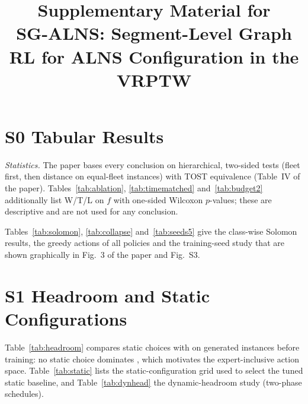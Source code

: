 \documentclass[conference,onecolumn]{IEEEtran}
\begin{document}
\title{Supplementary Material for\\ SG-ALNS: Segment-Level Graph RL for ALNS Configuration in the VRPTW}
\ifanonymous
\author{}
\else
\author{
\and
{}
\and
{}
}
\fi
\maketitle




\section*{S0 Tabular Results}
\emph{Statistics.} The paper bases every conclusion on hierarchical, two-sided tests (fleet first, then distance on
equal-fleet instances) with TOST equivalence (Table~IV of the paper). Tables~\ref{tab:ablation},
\ref{tab:timematched} and~\ref{tab:budget2} additionally list W/T/L on $f$ with one-sided Wilcoxon $p$-values; these
are descriptive and are not used for any conclusion.

Tables~\ref{tab:solomon}, \ref{tab:collapse} and~\ref{tab:seeds5} give the class-wise Solomon results, the greedy
actions of all policies and the training-seed study that are shown graphically in Fig.~3 of the paper and Fig.~S3.




\section*{S1 Headroom and Static Configurations}
Table~\ref{tab:headroom} compares static choices with \Rw{} on generated instances before training: no static choice
dominates \Rw{}, which motivates the expert-inclusive action space. Table~\ref{tab:static} lists the
static-configuration grid used to select the tuned static baseline, and Table~\ref{tab:dynhead} the dynamic-headroom
study (two-phase schedules).



\end{document}
